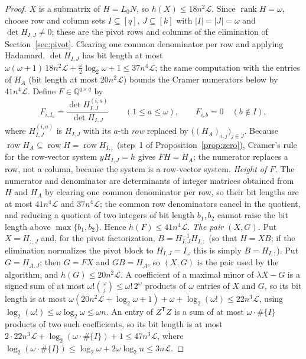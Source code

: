 \documentclass[journal]{IEEEtran}
\theoremstyle{plainn}
\theoremstyle{remark}
\begin{document}
\begin{proof}
$X$ is a submatrix of $H=L_0N$, so $h(X)\le18n^2\mathcal L$. Since $\operatorname{rank}H=\omega$, choose
row and column sets $I\subseteq[q]$, $J\subseteq[k]$ with $|I|=|J|=\omega$ and $\det H_{I,J}\ne0$; these
are the pivot rows and columns of the elimination of Section~\ref{sec:pivot}. Clearing one common
denominator per row and applying Hadamard, $\det H_{I,J}$ has bit length at most
$\omega(\omega+1)\,18n^2\mathcal L+\tfrac{\omega}{2}\log_2\omega+1\le37n^4\mathcal L$; the same
computation with the entries of $H_A$ (bit length at most $20n^2\mathcal L$) bounds the Cramer
numerators below by $41n^4\mathcal L$. Define $F\in\mathbb Q^{q\times q}$ by
\[
F_{i,I_a}=\frac{\det H^{(i,a)}_{I,J}}{\det H_{I,J}}\qquad(1\le a\le\omega),\qquad F_{i,b}=0\quad(b\notin I),
\]
where $H^{(i,a)}_{I,J}$ is $H_{I,J}$ with its $a$-th \emph{row} replaced by
$\bigl((H_A)_{i,j}\bigr)_{j\in J}$. Because $\operatorname{row}H_A\subseteq\operatorname{row}H
=\operatorname{row}H_{I,:}$ (step~1 of Proposition~\ref{prop:zero}), Cramer's rule for the row-vector
system $yH_{I,J}=h$ gives $FH=H_A$; the numerator replaces a row, not a column, because the system is a
row-vector system. \emph{Height of $F$.} The numerator and denominator are determinants of integer
matrices obtained from $H$ and $H_A$ by clearing one common denominator per row, so their bit lengths
are at most $41n^4\mathcal L$ and $37n^4\mathcal L$; the common row denominators cancel in the quotient,
and reducing a quotient of two integers of bit length $b_1,b_2$ cannot raise the bit length above
$\max\{b_1,b_2\}$. Hence $h(F)\le41n^4\mathcal L$. \emph{The pair $(X,G)$.} Put $X=H_{:,J}$ and, for the
pivot factorization, $B=H_{I,J}^{-1}H_{I,:}$ (so that $H=XB$; if the elimination normalizes the pivot
block to $H_{I,J}=I_\omega$ this is simply $B=H_{I,:}$). Put $G=H_{A,J}$; then $G=FX$ and $GB=H_A$, so
$(X,G)$ is the pair used by the algorithm, and $h(G)\le20n^2\mathcal L$. A coefficient of a maximal
minor of $\lambda X-G$ is a signed sum of at most $\omega!\binom{\omega}{j}\le\omega!\,2^\omega$
products of $\omega$ entries of $X$ and $G$, so its bit length is at most
$\omega(20n^2\mathcal L+\log_2\omega+1)+\omega+\log_2(\omega!)\le22n^3\mathcal L$, using
$\log_2(\omega!)\le\omega\log_2\omega\le\omega n$. An entry of $Z^{\mathsf T}Z$ is a sum of at most
$\omega\cdot\#\{I\}$ products of two such coefficients, so its bit length is at most
$2\cdot22n^3\mathcal L+\log_2(\omega\cdot\#\{I\})+1\le47n^3\mathcal L$, where
$\log_2(\omega\cdot\#\{I\})\le\log_2\omega+2\omega\log_2n\le3n\mathcal L$.
\end{proof}
\end{document}
